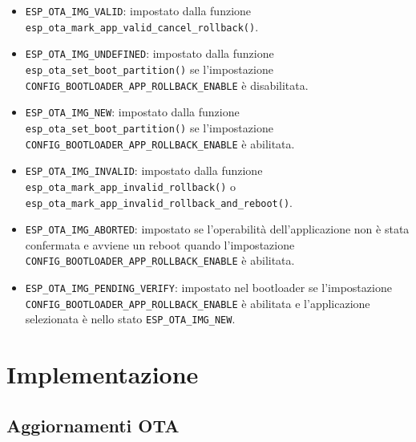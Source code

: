 \documentclass[a4paper]{article}
\begin{document}
\begin{itemize}
  \item \texttt{ESP\_OTA\_IMG\_VALID}: impostato dalla funzione \\
    \texttt{esp\_ota\_mark\_app\_valid\_cancel\_rollback()}.

  \item \texttt{ESP\_OTA\_IMG\_UNDEFINED}: impostato dalla funzione \\
    \texttt{esp\_ota\_set\_boot\_partition()} se l'impostazione \\
    \texttt{CONFIG\_BOOTLOADER\_APP\_ROLLBACK\_ENABLE} è disabilitata.

  \item \texttt{ESP\_OTA\_IMG\_NEW}: impostato dalla funzione \\
    \texttt{esp\_ota\_set\_boot\_partition()} se l'impostazione \\
    \texttt{CONFIG\_BOOTLOADER\_APP\_ROLLBACK\_ENABLE} è abilitata.

  \item \texttt{ESP\_OTA\_IMG\_INVALID}: impostato dalla funzione \\
    \texttt{esp\_ota\_mark\_app\_invalid\_rollback()} o \\
    \texttt{esp\_ota\_mark\_app\_invalid\_rollback\_and\_reboot()}.

  \item \texttt{ESP\_OTA\_IMG\_ABORTED}: impostato se l'operabilità dell'applicazione non
    è stata confermata e avviene un reboot quando l'impostazione \\
    \texttt{CONFIG\_BOOTLOADER\_APP\_ROLLBACK\_ENABLE} è abilitata.

  \item \texttt{ESP\_OTA\_IMG\_PENDING\_VERIFY}: impostato nel bootloader se l'impostazione \\
    \texttt{CONFIG\_BOOTLOADER\_APP\_ROLLBACK\_ENABLE} è abilitata e l'applicazione
    selezionata è nello stato \texttt{ESP\_OTA\_IMG\_NEW}.
\end{itemize}


\section{Implementazione}

\subsection{Aggiornamenti OTA}
\end{document}
